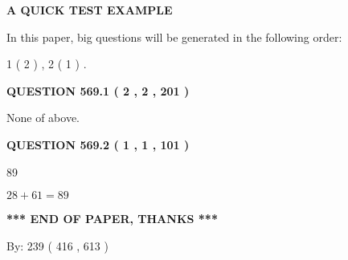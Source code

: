 \documentclass[12pt]{article}
\begin{document}
   
   
   
   
   
 \vspace{0.2in}
{\LARGE {\textbf{ A QUICK TEST EXAMPLE}}}
   
   
   
\vspace{0.2in}
   
In this paper, big questions will be generated in the following order: 
   
   
   1 ( 2 )
 ,
   2 ( 1 )
 .
  
\vspace{0.2in}
  
{\textbf{\Large{QUESTION
569.1 
 ( 2 , 2 , 201 )
}}}
  
  
 
 
\noindent{}
 
 
 None of above.
 
 
 
 
  
\vspace{0.2in}
  
{\textbf{\Large{QUESTION
569.2 
 ( 1 , 1 , 101 )
}}}
  
  
 
 
\noindent{}

89
 
 
 
 
\noindent{}

$ %
28 +  %
61=   %
89$
 
 
   
   
 \vspace{0.2in}
 
   
   
   
   
\vspace{1.0in} 
{\textbf{\large{ *** END OF PAPER, THANKS *** }}} 
   
   
\hspace{1.0in} By: 
 239 ( 416 ,  613 )
   
   
   
   
\newpage 
\setcounter{page}{ 
   570001 } 
   
   
   
\end{document}

